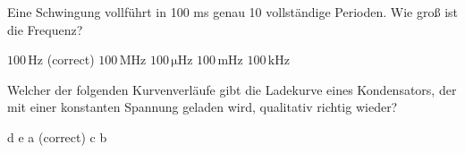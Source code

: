 \documentclass[11pt]{exam}
\begin{document}
\begin{questions}
\vspace{3mm}\question Eine Schwingung vollführt in 100 ms genau 10 vollständige Perioden. Wie groß ist die Frequenz?

\begin{choices}
	\choice \(\mathrm{100\,Hz}\) (correct)
	\choice \(\mathrm{100\,MHz}\)
	\choice \(\mathrm{100\,\mu Hz}\)
	\choice \(\mathrm{100\,mHz}\)
	\choice \(\mathrm{100\,kHz}\)
\end{choices}

\vspace{3mm}\question Welcher der folgenden Kurvenverläufe gibt die Ladekurve eines Kondensators, der mit einer konstanten Spannung geladen wird, qualitativ richtig wieder?

\begin{choices}
	\choice d
	\choice e
	\choice a (correct)
	\choice c
	\choice b
\end{choices}

\vspace{3mm}\end{questions}
\end{document}
